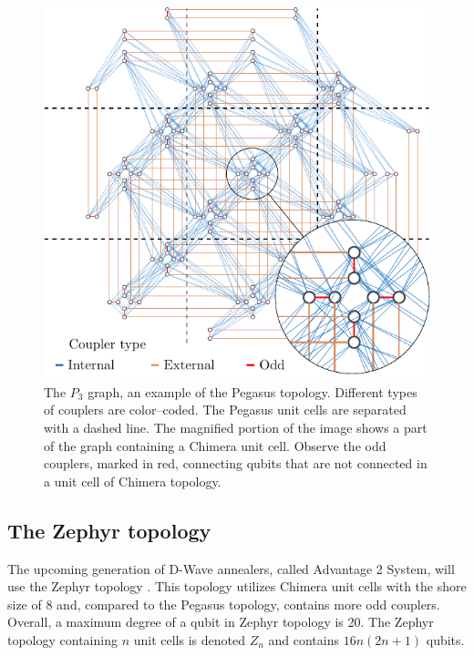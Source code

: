 \begin{figure}
    \includegraphics[width=\textwidth]{figures/pegasus}
    \caption{
        The $P_3$ graph, an example of the Pegasus topology. Different types of couplers are
        color--coded. The Pegasus unit cells are separated with a dashed line. The magnified portion
        of the image shows a part of the graph containing a Chimera unit cell. Observe the odd
        couplers, marked in red, connecting qubits that are not connected in a unit cell of Chimera topology.
    }
    \label{fig:pegasus}
\end{figure}

\subsection{The Zephyr topology}
The upcoming generation of D-Wave annealers, called Advantage 2 System, will use the Zephyr topology
\cite{}. This topology utilizes Chimera unit cells with the shore size of 8 and, compared to the
Pegasus topology, contains more odd couplers. Overall, a maximum degree of a qubit in Zephyr
topology is 20. The Zephyr topology containing $n$ unit cells is denoted $Z_n$ and contains
$16n(2n+1)$ qubits.

